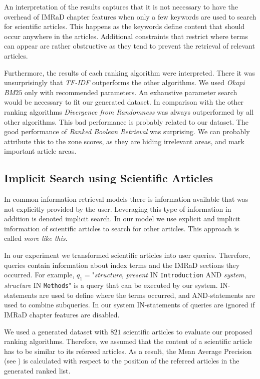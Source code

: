 An interpretation of the results captures that it is not necessary to have the overhead of IMRaD chapter features when only a few keywords are used to search for scientific articles. This happens as the keywords define content that should occur anywhere in the articles. Additional constraints that restrict where terms can appear are rather obstructive as they tend to prevent the retrieval of relevant articles.

Furthermore, the results of each ranking algorithm were interpreted. There it was unsurprisingly that \textit{TF-IDF} outperforms the other algorithms. We used \textit{Okapi BM$25$} only with recommended parameters. An exhaustive parameter search would be necessary to fit our generated dataset. In comparison with the other ranking algorithms \textit{Divergence from Randomness} was always outperformed by all other algorithms. This bad performance is probably related to our dataset. The good performance of \textit{Ranked Boolean Retrieval} was surprising. We can probably attribute this to the zone scores, as they are hiding irrelevant areas, and mark important article areas.

\subsection{Implicit Search using Scientific Articles}
\label{sec:implicit_search_results}

In common information retrieval models there is information available that was not explicitly provided by the user. Leveraging this type of information in addition is denoted implicit search. In our model we use explicit and implicit information of scientific articles to search for other articles. This approach is called \textit{more like this}.

In our experiment we transformed scientific articles into user queries. Therefore, queries contain information about index terms and the IMRaD sections they occurred. For example, $q_1=$"\textit{structure}, \textit{present} IN \texttt{Introduction} AND \textit{system}, \textit{structure} IN \texttt{Methods}" is a query that can be executed by our system. IN-statements are used to define where the terms occurred, and AND-statements are used to combine subqueries. In our system IN-statements of queries are ignored if IMRaD chapter features are disabled.

We used a generated dataset with $821$ scientific articles to evaluate our proposed ranking algorithms. Therefore, we assumed that the content of a scientific article has to be similar to its refereed articles. As a result, the Mean Average Precision (see ) is calculated with respect to the position of the refereed articles in the generated ranked list.

